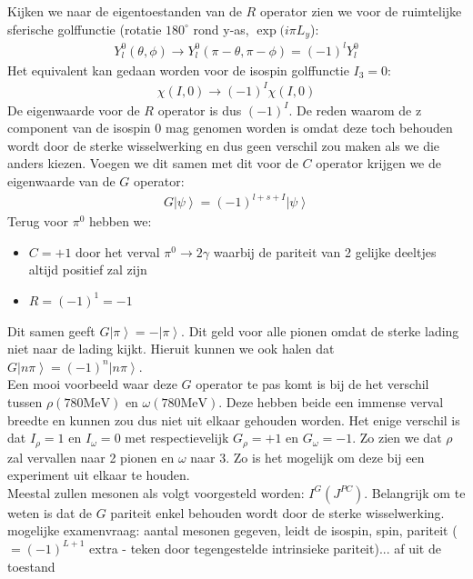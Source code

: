 \documentclass[../main.tex]{subfiles}
\begin{document}
Kijken we naar de eigentoestanden van de $R$ operator zien we voor de ruimtelijke sferische golffunctie (rotatie $180^\circ$ rond y-as, $\exp(i\pi L_y$):
\begin{equation}
    \begin{aligned}
        \label{eq:ruimte_y_rotatie}
        Y_l^0(\theta, \phi) \rightarrow Y_l^0(\pi - \theta, \pi - \phi) = (-1)^lY_l^0
    \end{aligned}
\end{equation}
Het equivalent kan gedaan worden voor de isospin golffunctie $I_3=0$:
\begin{equation}
    \begin{aligned}
        \label{eq:isospin_y_rotatie}
        \chi(I,0) \rightarrow (-1)^I\chi(I,0)
    \end{aligned}
\end{equation}
De eigenwaarde voor de $R$ operator is dus $(-1)^I$. De reden waarom de z component van de isospin $0$ mag genomen worden is omdat deze toch behouden wordt door de sterke wisselwerking en dus geen verschil zou maken als we die anders kiezen. Voegen we dit samen met dit voor de $C$ operator krijgen we de eigenwaarde van de $G$ operator:
\begin{equation}
    \begin{aligned}
        \label{eq:eigenwaarde_g}
        G\left|\psi\right>=(-1)^{l+s+I}\left|\psi\right>
    \end{aligned}
\end{equation}
Terug voor $\pi^0$ hebben we:
\begin{itemize}
    \item $C=+1$ door het verval $\pi^0\rightarrow2\gamma$ waarbij de pariteit van 2 gelijke deeltjes altijd positief zal zijn
    \item $R=(-1)^1=-1$
\end{itemize}
Dit samen geeft $G\left|\pi\right>=-\left|\pi\right>$. Dit geld voor alle pionen omdat de sterke lading niet naar de lading kijkt. Hieruit kunnen we ook halen dat $G\left|n\pi\right>=(-1)^n\left|n\pi\right>$.\\
Een mooi voorbeeld waar deze $G$ operator te pas komt is bij de het verschil tussen $\rho(780\text{MeV})$ en $\omega(780\text{MeV})$. Deze hebben beide een immense verval breedte en kunnen zou dus niet uit elkaar gehouden worden. Het enige verschil is dat $I_\rho=1$ en $I_\omega=0$ met respectievelijk $G_\rho=+1$ en $G_\omega=-1$. Zo zien we dat $\rho$ zal vervallen naar 2 pionen en $\omega$ naar 3. Zo is het mogelijk om deze bij een experiment uit elkaar te houden.\\
Meestal zullen mesonen als volgt voorgesteld worden: $I^G(J^{PC})$. Belangrijk om te weten is dat de $G$ pariteit enkel behouden wordt door de sterke wisselwerking.\\

{\color{red} mogelijke examenvraag: aantal mesonen gegeven, leidt de isospin, spin, pariteit ($=(-1)^{L+1}$ extra - teken door tegengestelde intrinsieke pariteit)... af uit de toestand}
\end{document}
